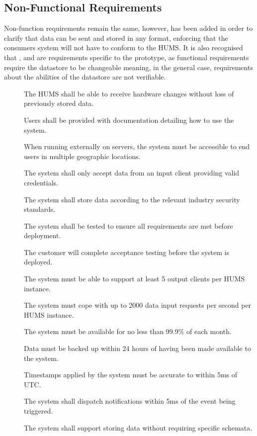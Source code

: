 \subsection{Non-Functional Requirements}
Non-function requirements remain the same, however,  has been added in order to clarify that data can be sent and stored in any format, enforcing that the consumers system will not have to conform to the HUMS. It is also recognised that ,  and  are requirements specific to the prototype, as functional requirements require the datastore to be changeable meaning, in the general case, requirements about the abilities of the datastore are not verifiable.
\begin{description}
\item[] The HUMS shall be able to receive hardware changes without loss of previously stored data.
\item[]  Users shall be provided with documentation detailing how to use the system.
\item[] When running externally on servers, the system must be accessible to end users in multiple
geographic locations.
\item[]  The system shall only accept data from an input client providing valid credentials. 
\item[] The system shall store data according to the relevant industry security standards. 
\item[]  The system shall be tested to ensure all requirements are met before deployment.
\item[] The customer will complete acceptance testing before the system is deployed.
\item[] The system must be able to support at least 5 output clients per HUMS instance. 
\item[]  The system must cope with up to 2000 data input requests per second per HUMS instance. 
\item[] The system must be available for no less than 99.9\% of each month.
\item[]  Data must be backed up within 24 hours of having been made available to the system.
 \item[] Timestamps applied by the system must be accurate to within 5ms of UTC.
\item[]  The system shall dispatch notifications within 5ms of the event being triggered.
\item[] The system shall support storing data without requiring specific schemata.
\end{description}


